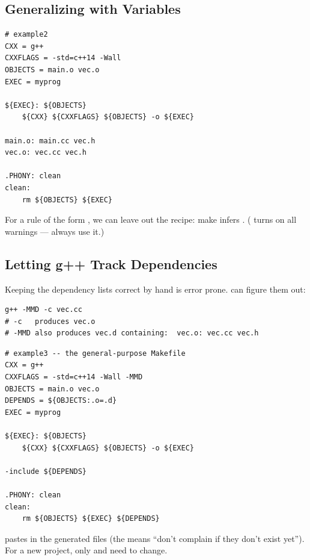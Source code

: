 \subsection{Generalizing with Variables}
\begin{lstlisting}[style=bash]
# example2
CXX = g++
CXXFLAGS = -std=c++14 -Wall
OBJECTS = main.o vec.o
EXEC = myprog

${EXEC}: ${OBJECTS}
	${CXX} ${CXXFLAGS} ${OBJECTS} -o ${EXEC}

main.o: main.cc vec.h
vec.o: vec.cc vec.h

.PHONY: clean
clean:
	rm ${OBJECTS} ${EXEC}
\end{lstlisting}
For a rule of the form , we can leave out the recipe:
make infers . ( turns
on all warnings --- always use it.)

\subsection{Letting g++ Track Dependencies}
Keeping the dependency lists correct by hand is error prone.  can
figure them out:
\begin{lstlisting}[style=bash]
g++ -MMD -c vec.cc
# -c   produces vec.o
# -MMD also produces vec.d containing:  vec.o: vec.cc vec.h
\end{lstlisting}

\begin{lstlisting}[style=bash]
# example3 -- the general-purpose Makefile
CXX = g++
CXXFLAGS = -std=c++14 -Wall -MMD
OBJECTS = main.o vec.o
DEPENDS = ${OBJECTS:.o=.d}
EXEC = myprog

${EXEC}: ${OBJECTS}
	${CXX} ${CXXFLAGS} ${OBJECTS} -o ${EXEC}

-include ${DEPENDS}

.PHONY: clean
clean:
	rm ${OBJECTS} ${EXEC} ${DEPENDS}
\end{lstlisting}
 pastes in the generated  files (the
\code{-} means ``don't complain if they don't exist yet''). For a new project,
only  and  need to change.

